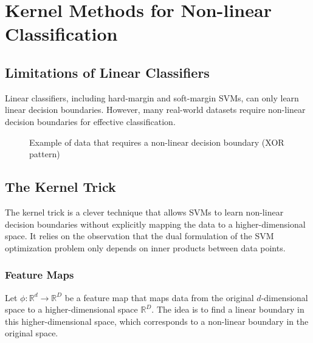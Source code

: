 \documentclass{article}
\begin{document}
\section{Kernel Methods for Non-linear Classification}

\subsection{Limitations of Linear Classifiers}
Linear classifiers, including hard-margin and soft-margin SVMs, can only learn linear decision boundaries. However, many real-world datasets require non-linear decision boundaries for effective classification.

\begin{figure}[h]
\centering
{}
\caption{Example of data that requires a non-linear decision boundary (XOR pattern)}
\end{figure}

\subsection{The Kernel Trick}
The kernel trick is a clever technique that allows SVMs to learn non-linear decision boundaries without explicitly mapping the data to a higher-dimensional space. It relies on the observation that the dual formulation of the SVM optimization problem only depends on inner products between data points.

\subsubsection{Feature Maps}
Let $\phi: \mathbb{R}^d \rightarrow \mathbb{R}^D$ be a feature map that maps data from the original $d$-dimensional space to a higher-dimensional space $\mathbb{R}^D$. The idea is to find a linear boundary in this higher-dimensional space, which corresponds to a non-linear boundary in the original space.
\end{document}
